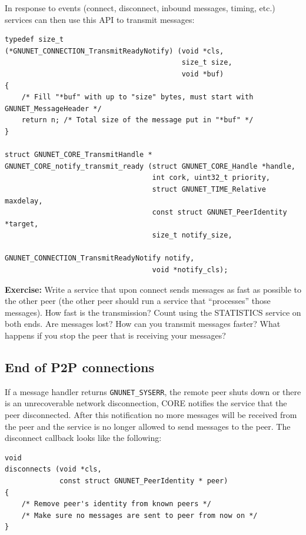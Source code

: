 \documentclass[10pt]{article}
\newcommand{\exercise}[1]{\noindent\begin{boxedminipage}{\textwidth}{\bf Exercise:} #1 \end{boxedminipage}}
\begin{document}
In response to events (connect, disconnect, inbound messages,
timing, etc.) services can then use this API to transmit messages:

\lstset{language=C}
\begin{lstlisting}
typedef size_t
(*GNUNET_CONNECTION_TransmitReadyNotify) (void *cls,
                                          size_t size,
                                          void *buf)
{
    /* Fill "*buf" with up to "size" bytes, must start with GNUNET_MessageHeader */
    return n; /* Total size of the message put in "*buf" */
}

struct GNUNET_CORE_TransmitHandle *
GNUNET_CORE_notify_transmit_ready (struct GNUNET_CORE_Handle *handle,
                                   int cork, uint32_t priority,
                                   struct GNUNET_TIME_Relative maxdelay,
                                   const struct GNUNET_PeerIdentity *target,
                                   size_t notify_size,
                                   GNUNET_CONNECTION_TransmitReadyNotify notify,
                                   void *notify_cls);
\end{lstlisting}

\exercise{Write a service that upon connect sends messages as
fast as possible to the other peer (the other peer should run a
service that ``processes'' those messages).  How fast is the
transmission?  Count using the STATISTICS service on both ends.  Are
messages lost? How can you transmit messages faster?  What happens if
you stop the peer that is receiving your messages?}


\subsection{End of P2P connections}

If a message handler returns {\tt GNUNET\_SYSERR}, the remote peer shuts down or
there is an unrecoverable network disconnection, CORE notifies the service that
the peer disconnected. After this notification no more messages will be received
from the peer and the service is no longer allowed to send messages to the peer.
The disconnect callback looks like the following:

\lstset{language=C}
\begin{lstlisting}
void
disconnects (void *cls,
             const struct GNUNET_PeerIdentity * peer)
{
    /* Remove peer's identity from known peers */
    /* Make sure no messages are sent to peer from now on */
}
\end{lstlisting}
\end{document}
